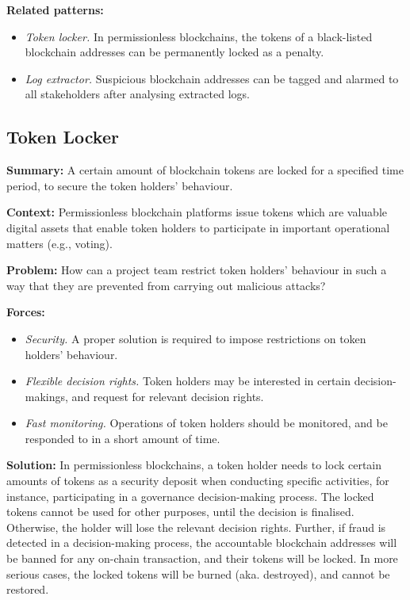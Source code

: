 \documentclass{article}
\begin{document}
\vspace{0.5em}\noindent \textbf{Related patterns:} 

\begin{itemize}
    \item \textit{Token locker.} In permissionless blockchains, the tokens of a black-listed blockchain addresses can be permanently locked as a penalty.
    
    \item \textit{Log extractor.} Suspicious blockchain addresses can be tagged and alarmed to all stakeholders after analysing extracted logs.
\end{itemize}


\subsection{Token Locker}

\vspace{0.5em}\noindent \textbf{Summary:} A certain amount of blockchain tokens are locked for a specified time period, to secure the token holders' behaviour.


\vspace{0.5em}\noindent \textbf{Context:} Permissionless blockchain platforms issue tokens which are valuable digital assets that enable token holders to participate in important operational matters (e.g., voting).

\vspace{0.5em}\noindent \textbf{Problem:} How can a project team restrict token holders' behaviour in such a way that they are prevented from carrying out malicious attacks?


\vspace{0.5em}\noindent \textbf{Forces:} 

\begin{itemize}
  \item \textit{Security.} A proper solution is required to impose restrictions on token holders' behaviour.
  
  \item \textit{Flexible decision rights.} Token holders may be interested in certain decision-makings, and request for relevant decision rights.
  
  \item \textit{Fast monitoring.} Operations of token holders should be monitored, and be responded to in a short amount of time.
\end{itemize}

\vspace{0.5em}\noindent \textbf{Solution:}  
In permissionless blockchains, a token holder needs to lock certain amounts of tokens as a security deposit when conducting specific activities, for instance, participating in a governance decision-making process. The locked tokens cannot be used for other purposes, until the decision is finalised. Otherwise, the holder will lose the relevant decision rights. Further, if fraud is detected in a decision-making process, the accountable blockchain addresses will be banned for any on-chain transaction, and their tokens will be locked. In more serious cases, the locked tokens will be burned (aka. destroyed), and cannot be restored.
\end{document}
